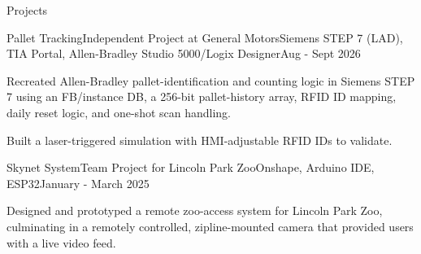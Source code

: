 \documentclass[
    a4paper,
    9pt,
]{resume}
\begin{document}
\begin{rSection}{Projects}
    \begin{rSubsection}{Pallet Tracking}{Independent Project at General Motors}{Siemens STEP 7 (LAD), TIA Portal, Allen-Bradley Studio 5000/Logix Designer}{Aug - Sept 2026}
	  \item Recreated Allen-Bradley pallet-identification and counting logic in Siemens STEP 7 using an FB/instance DB, a 256-bit pallet-history array, RFID ID mapping, daily reset logic, and one-shot scan handling.
    \item Built a laser-triggered simulation with HMI-adjustable RFID IDs to validate.
    \end{rSubsection}


\begin{rSubsection}{Skynet System}{Team Project for Lincoln Park Zoo}{Onshape, Arduino IDE, ESP32}{January - March 2025}
	  \item Designed and prototyped a remote zoo-access system for Lincoln Park Zoo, culminating in a remotely controlled, zipline-mounted camera that provided users with a live video feed.
    \end{rSubsection}
    
  \end{rSection}

%



\end{document}
